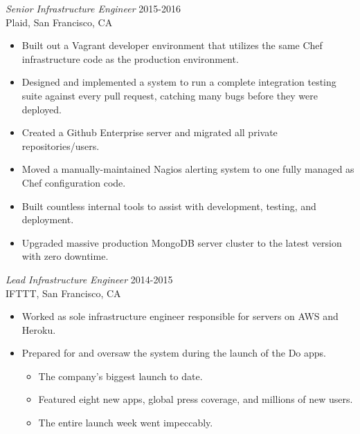 \documentclass[line,margin]{res}
\begin{document}
\begin{resume}
  {\sl Senior Infrastructure Engineer}  \hfill 2015-2016 \\
  Plaid,
  San Francisco, CA
  \begin{itemize}  \itemsep -2pt %
    \item Built out a Vagrant developer environment that utilizes the same Chef infrastructure code as the production environment.
    \item Designed and implemented a system to run a complete integration testing suite against every pull request, catching many bugs before they were deployed.
    \item Created a Github Enterprise server and migrated all private repositories/users.
    \item Moved a manually-maintained Nagios alerting system to one fully managed as Chef configuration code.
    \item Built countless internal tools to assist with development, testing, and deployment.
    \item Upgraded massive production MongoDB server cluster to the latest version with zero downtime.
  \end{itemize}

  {\sl Lead Infrastructure Engineer}  \hfill 2014-2015 \\
  IFTTT,
  San Francisco, CA
  \begin{itemize}  \itemsep -2pt %
    \item Worked as sole infrastructure engineer responsible for servers on AWS and Heroku.
    \item Prepared for and oversaw the system during the launch of the Do apps.
 
    \vspace{-2.5mm} %
    \begin{itemize}  \itemsep -3pt %
      \item The company's biggest launch to date.
      \item Featured eight new apps, global press coverage, and millions of new users. 
      \item The entire launch week went impeccably.
    \end{itemize}
    \vspace{-2.0mm} %


\end{itemize}
\end{resume}
\end{document}
